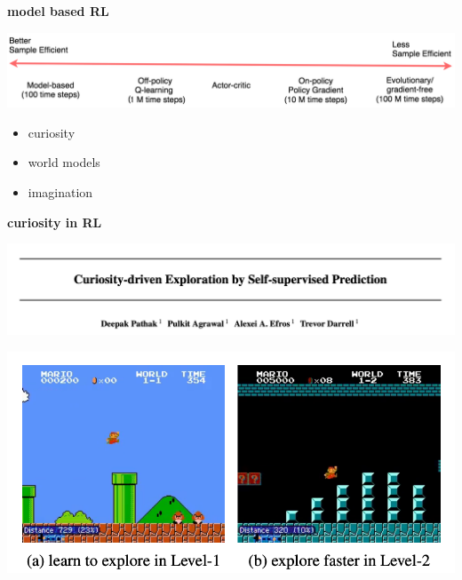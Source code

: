 \documentclass[xcolor=dvipsnames]{beamer}
\begin{document}
\begin{frame}{\bf model based RL}

  {\centering \includegraphics[scale=0.22]{../images/samples.png}}

  \begin{itemize}
    \item curiosity
    \item world models
    \item imagination
  \end{itemize}

\end{frame}

\begin{frame}{\bf curiosity in RL}

  {\centering \includegraphics[scale=0.2]{../images/paper_curiosity_0.png}}

  {\centering \includegraphics[scale=0.3]{../images/paper_curiosity_1.png}}

\end{frame}
\end{document}

